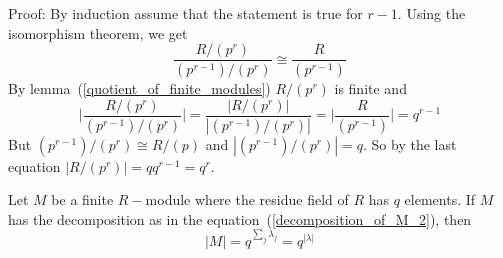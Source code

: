 Proof: By induction assume that the statement is true for $r-1$. Using the isomorphism theorem, we get
\begin{equation}
    \frac{R/(p^r)}{(p^{r-1})/(p^r)}\cong \frac{R}{(p^{r-1})}
\end{equation}
By lemma~(\ref{quotient_of_finite_modules}) $R/(p^r)$ is finite and
\begin{equation}
    \Bigg|\frac{R/(p^r)}{(p^{r-1})/(p^r)}\Bigg| = \frac{|R/(p^r)|}{|(p^{r-1})/(p^r)|}= \Bigg|\frac{R}{(p^{r-1})}\Bigg| = q^{r-1}
\end{equation}
But $(p^{r-1})/(p^r)\cong R/(p)$ and $|(p^{r-1})/(p^r)|=q$. So by the last equation $|R/(p^r)|=qq^{r-1}=q^r$.
\begin{dang}
    \begin{corollary}\label{cardinality_of_a_finite_Rmodule}
        Let $M$ be a finite $R-$module where the residue field of $R$ has $q$ elements. If $M$ has the decomposition as in the equation~(\ref{decomposition_of_M_2}), then
        \[
        |M|=q^{\sum_j\lambda_j}=q^{|\lambda|}
        \]
    \end{corollary}
\end{dang}
